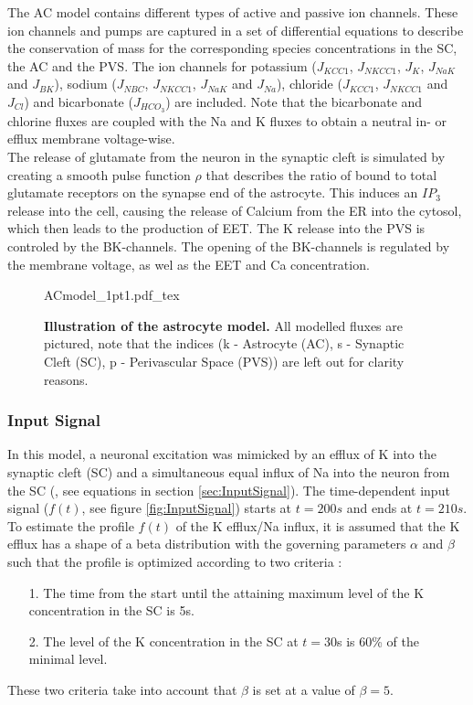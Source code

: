 The AC model contains different types of active and passive ion channels. These ion channels and pumps are captured in a set of differential equations to describe the conservation of mass for the corresponding species concentrations in the SC, the \gls{AC} and the \gls{PVS}. The ion channels for potassium ($ J_{KCC1}$, $ J_{NKCC1} $, $ J_{K}$, $ J_{NaK} $ and $J_{BK}$), sodium ($ J_{NBC} $, $ J_{NKCC1} $,  $ J_{NaK} $ and  $ J_{Na} $), chloride ($ J_{KCC1}$, $ J_{NKCC1} $ and $ J_{Cl} $) and bicarbonate ($ J_{HCO_3}$) are included. Note that the bicarbonate and chlorine fluxes are coupled with the \gls{Na} and \gls{K} fluxes to obtain a neutral in- or efflux membrane voltage-wise.\\

The release of glutamate from the neuron in the synaptic cleft is simulated by creating a smooth pulse function $\rho$ that describes the ratio of bound to total glutamate receptors on the synapse end of the astrocyte. This induces an $IP_3$ release into the cell, causing the release of Calcium from the \gls{ER} into the cytosol, which then leads to the production of EET. The \gls{K} release into the \gls{PVS} is controled by the BK-channels. The opening of the BK-channels is regulated by the membrane voltage, as wel as the EET and \gls{Ca} concentration.
\begin{figure}[h!]
  \centering
  \def\svgwidth{450pt} %
  \scriptsize
  {ACmodel_1pt1.pdf_tex}
  \caption{\textbf{Illustration of the astrocyte model.} All modelled fluxes are pictured, note that the indices (k - Astrocyte (AC), s - Synaptic Cleft (SC), p - Perivascular Space (PVS)) are left out for clarity reasons.}
\label{fig:ACmodel}
\end{figure}
\vspace{3cm}

\subsubsection{Input Signal}
In this model, a neuronal excitation was mimicked by an efflux of \gls{K} into the synaptic cleft (SC) and a simultaneous equal influx of \gls{Na} into the neuron from the SC (\citet{Ostby2009}, see equations in section \ref{sec:InputSignal}). The time-dependent input signal ($f(t)$, see figure \ref{fig:InputSignal}) starts at $t=200 s$ and ends at $t=210 s$. To estimate the profile $f(t)$ of the \gls{K} efflux/\gls{Na} influx, it is assumed that the \gls{K} efflux has a shape of a beta distribution with the governing parameters $\alpha$ and $\beta$ such that the profile is optimized according to two criteria \cite{Ostby2009}:\\
%
\begin{itemize}
\item [1.] The time from the start until the attaining maximum level of the \gls{K} concentration in the SC is 5s.
\item [2.] The level of the \gls{K} concentration in the SC at $ t = 30 $s is 60\% of the minimal level.
\end{itemize}
%
These two criteria take into account that $\beta$ is set at a value of $\beta = 5$.\\

